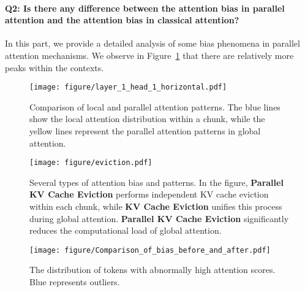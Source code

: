 
\paragraph{Q2: Is there any difference between the attention bias in parallel attention and the attention bias in classical attention?}
In this part, we provide a detailed analysis of some bias phenomena in parallel attention mechanisms. We observe in Figure~\ref{fig:parrallel_attention} that there are relatively more peaks within the contexts. 

\begin{figure}[H]
\begin{center}
\centerline{\texttt{[image: figure/layer\_1\_head\_1\_horizontal.pdf]}}
\caption{Comparison of local and parallel attention patterns. The blue lines show the local attention distribution within a chunk, while the yellow lines represent the parallel attention patterns in global attention.}
\label{fig:parrallel_attention}
\end{center}
\vspace{-8mm}
\end{figure}

\vspace{-2mm}
\begin{figure*}[ht]
\begin{center}
\texttt{[image: figure/eviction.pdf]}
\caption{Several types of attention bias and patterns. In the figure, \textbf{Parallel KV Cache Eviction} performs independent KV cache eviction within each chunk, while \textbf{KV Cache Eviction} unifies this process during global attention. \textbf{Parallel KV Cache Eviction} significantly reduces the computational load of global attention.}
\label{fig:attention_pattern_comparison}
\end{center}
\end{figure*}
\FloatBarrier


\begin{figure}[H]
\begin{center}
\centerline{\texttt{[image: figure/Comparison\_of\_bias\_before\_and\_after.pdf]}}
\caption{The distribution of tokens with abnormally high attention scores. Blue represents outliers.}
\label{fig:parrallel_attention_count}
\end{center}
\vspace{-2mm}
\end{figure}


